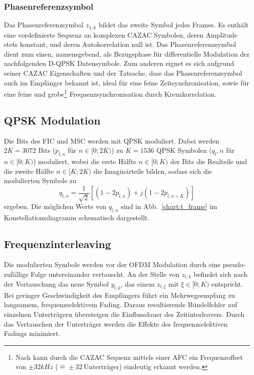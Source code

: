 \subsubsection{Phasenreferenzsymbol}
\label{sec:phasenreferenzsymbol}
Das Phasenreferenzsymbol $z_{1,k}$ bildet das zweite Symbol jedes Frames. Es enthält eine vordefinierte Sequenz an komplexen \ac{CAZAC} Symbolen, deren Amplitude stets konstant, und deren Autokorrelation null ist. Das Phasenreferenzsymbol dient zum einen, namensgebend, als Bezugsphase für differentielle Modulation der nachfolgenden D-QPSK Datensymbole. Zum anderen eignet es sich aufgrund seiner \ac{CAZAC} Eigenschaften und der Tatsache, dass das Phasenreferenzsymbol auch im Empfänger bekannt ist, ideal für eine feine Zeitsynchronisation, sowie für eine feine und grobe\footnote{Nach \cite{dab_buch} kann durch die CAZAC Sequenz mittels einer \ac{AFC} ein Frequenzoffset von $\pm 32kHz$ ($\hat{=} \pm 32 \: \text{Unterträger}$) eindeutig erkannt werden.} Frequenzsynchronisation durch Kreuzkorrelation.

\subsection{QPSK Modulation}
\label{sec:qpsk}
Die Bits des FIC und MSC werden mit QPSK moduliert. Dabei werden $2K=3072$ Bits ($p_{l,n}$ für $n\in[0;2K)$) zu $K=1536$ QPSK Symbolen ($q_l,n$ für $n\in[0;K)$) moduliert, wobei die erste Hälfte $n\in [0;K)$ der Bits die Realteile und die zweite Hälfte $n\in [K;2K)$ die Imaginärteile bilden, sodass sich die modulierten Symbole zu
\begin{equation}
q_{l,n} = \frac{1}{\sqrt{2}}\left[\left(1-2p_{l,n}\right)+j\left(1-2p_{l,n+K}\right)\right]
\end{equation}
ergeben. Die möglichen Werte von $q_{l,n}$ sind in Abb.~\ref{chart:t_frame} im Konstellationsdiagramm schematisch dargestellt.

\subsection{Frequenzinterleaving}
Die modulierten Symbole werden vor der OFDM Modulation durch eine pseudo-zufällige Folge untereinander vertauscht. An der Stelle von $z_{l,k}$ befindet sich nach der Vertauschung das neue Symbol $y_{l,k}$, das einem $z_{l,\xi}$ mit $\xi \in [0;K)$ entspricht. Bei geringer Geschwindigkeit des Empfängers führt ein Mehrwegeempfang zu langsamem, frequenzselektivem Fading. Daraus resultierende Bündelfehler auf einzelnen Unterträgern übersteigen die Einflussdauer des Zeitinterleavers. Durch das Vertauschen der Unterträger werden die Effekte des frequenzselektiven Fadings minimiert.


